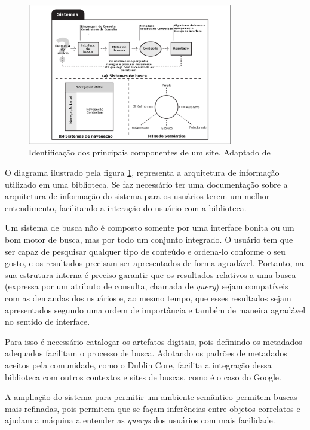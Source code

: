 \graphicspath{{figuras/}}
\begin{figure}[H]
\centering
\includegraphics[width=0.8\textwidth]{sistemas}
\caption[Identificação dos principais componentes de uma biblioteca]{Identificação dos principais componentes de um site. Adaptado de \cite{rosenfeld2002information}}
\label{fig:sistemasoftware}
\end{figure}

O diagrama ilustrado pela figura \ref{fig:sistemasoftware}, representa a arquitetura de informação utilizado em uma biblioteca. Se faz necessário ter uma documentação sobre a arquitetura de informação do sistema para os usuários terem um melhor entendimento, facilitando a interação do usuário com a biblioteca.

Um sistema de busca não é composto somente por uma interface bonita ou um bom motor de busca, mas por todo um conjunto integrado. O usuário tem que ser capaz de pesquisar qualquer tipo de conteúdo e ordena-lo conforme o seu gosto, e os resultados precisam ser apresentados de forma agradável. Portanto, na sua estrutura interna é preciso garantir que os resultados relativos a uma busca (expressa por um atributo de consulta, chamada de \textit{query}) sejam compatíveis com as demandas dos usuários e, ao mesmo tempo, que esses resultados sejam apresentados segundo uma ordem de importância e também de maneira agradável no sentido de interface. 

Para isso é necessário catalogar os artefatos digitais, pois definindo os metadados adequados facilitam o processo de busca. Adotando os padrões de metadados aceitos pela comunidade, como o Dublin Core, facilita a integração dessa biblioteca com outros contextos e sites de buscas, como é o caso do Google.

A ampliação do sistema para permitir um ambiente semântico permitem buscas mais refinadas, pois permitem que se façam inferências entre objetos correlatos e ajudam a máquina a entender as \textit{querys} dos usuários com mais facilidade. 


